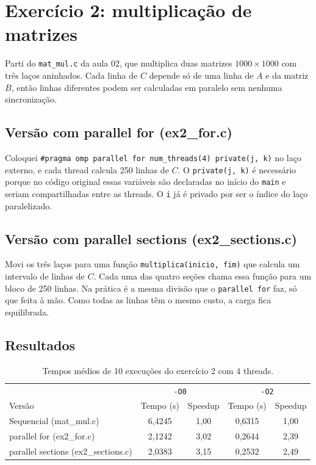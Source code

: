 \documentclass[11pt,a4paper]{article}
\begin{document}
\section{Exercício 2: multiplicação de matrizes}

Parti do \texttt{mat\_mul.c} da aula 02, que multiplica duas matrizes $1000 \times 1000$ com três laços aninhados. Cada linha de $C$ depende só de uma linha de $A$ e da matriz $B$, então linhas diferentes podem ser calculadas em paralelo sem nenhuma sincronização.

\subsection{Versão com parallel for (ex2\_for.c)}

Coloquei \texttt{\#pragma omp parallel for num\_threads(4) private(j, k)} no laço externo, e cada thread calcula 250 linhas de $C$. O \texttt{private(j, k)} é necessário porque no código original essas variáveis são declaradas no início do \texttt{main} e seriam compartilhadas entre as threads. O \texttt{i} já é privado por ser o índice do laço paralelizado.

\subsection{Versão com parallel sections (ex2\_sections.c)}

Movi os três laços para uma função \texttt{multiplica(inicio, fim)} que calcula um intervalo de linhas de $C$. Cada uma das quatro seções chama essa função para um bloco de 250 linhas. Na prática é a mesma divisão que o \texttt{parallel for} faz, só que feita à mão. Como todas as linhas têm o mesmo custo, a carga fica equilibrada.

\subsection{Resultados}

\begin{table}[h]
\centering
\begin{tabular}{lcccc}
\toprule
 & \multicolumn{2}{c}{\texttt{-O0}} & \multicolumn{2}{c}{\texttt{-O2}} \\
Versão & Tempo (s) & Speedup & Tempo (s) & Speedup \\
\midrule
Sequencial (mat\_mul.c) & 6,4245 & 1,00 & 0,6315 & 1,00 \\
parallel for (ex2\_for.c) & 2,1242 & 3,02 & 0,2644 & 2,39 \\
parallel sections (ex2\_sections.c) & 2,0383 & 3,15 & 0,2532 & 2,49 \\
\bottomrule
\end{tabular}
\caption{Tempos médios de 10 execuções do exercício 2 com 4 threads.}
\end{table}
\end{document}
